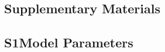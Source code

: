 \documentclass[pdflatex,sn-apa]{sn-jnl}%
\begin{document}
\begin{appendices}




\newpage

\section*{Supplementary Materials}

\renewcommand{\thetable}{S\arabic{table}}
\renewcommand{\thefigure}{S\arabic{figure}}
\renewcommand{\theequation}{S\arabic{equation}}
\setcounter{table}{0}
\setcounter{figure}{0}
\setcounter{equation}{0}

\subsection*{S1\quad Model Parameters}


\end{appendices}
\end{document}
